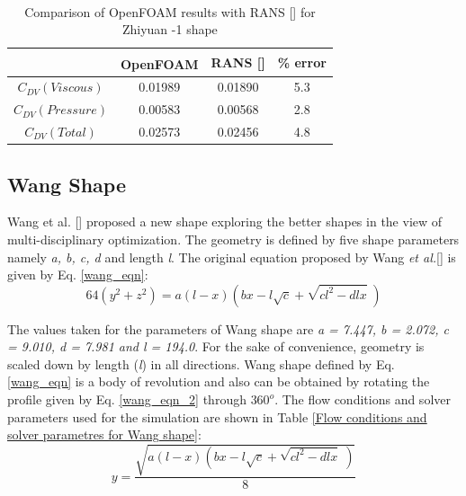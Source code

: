 \begin{table}[H]
	\centering
	\caption{\label{Zhiyuan -1 Cdv} Comparison of OpenFOAM\textsuperscript{\textregistered} results with RANS [] for Zhiyuan -1 shape}
	\begin{tabular}{cccc}
		\hline \hline
		& OpenFOAM\textsuperscript{\textregistered} & RANS [\citenum{Suman2011}] & \% error    \\ \hline \hline
		
		$ C_{DV} (Viscous)$ & 0.01989 & 0.01890 & 5.3    \\  
		$ C_{DV} (Pressure) $ & 0.00583 & 0.00568 & 2.8    \\
		$ C_{DV} (Total) $ & 0.02573 & 0.02456 & 4.8    \\  \hline
	\end{tabular}
\end{table}


\subsection{Wang Shape}
Wang et al. [] proposed a new shape exploring the better shapes in the view of multi-disciplinary optimization. The geometry is defined by five shape parameters namely \textit{a, b, c, d} and length \textit{l}. The original equation proposed by Wang \textit{et al.}[] is given by Eq. \ref{wang_eqn}:
\begin{equation}
64(y^{2} + z^{2}) = a(l-x)\left( bx - l \sqrt{c} + \sqrt{c l^{2} - dlx} \; \right) 
\label{wang_eqn}
\end{equation}

The values taken for the parameters of Wang shape are \textit{a = 7.447, b = 2.072, c = 9.010, d = 7.981 and l = 194.0}. For the sake of convenience, geometry is scaled down by length (\textit{l}) in all directions. Wang shape defined by Eq. \ref{wang_eqn} is a body of revolution and also can be obtained by rotating the profile given by Eq. \ref{wang_eqn_2} through $ 360^{o} $. The flow conditions and solver parameters used for the simulation are shown in Table \ref{Flow conditions and solver parametres for Wang shape}:
\begin{equation}
y = \dfrac{\sqrt{a(l-x)\left( bx - l \sqrt{c} + \sqrt{c l^{2} - dlx} \; \right)}}{8} 
\label{wang_eqn_2}
\end{equation}

